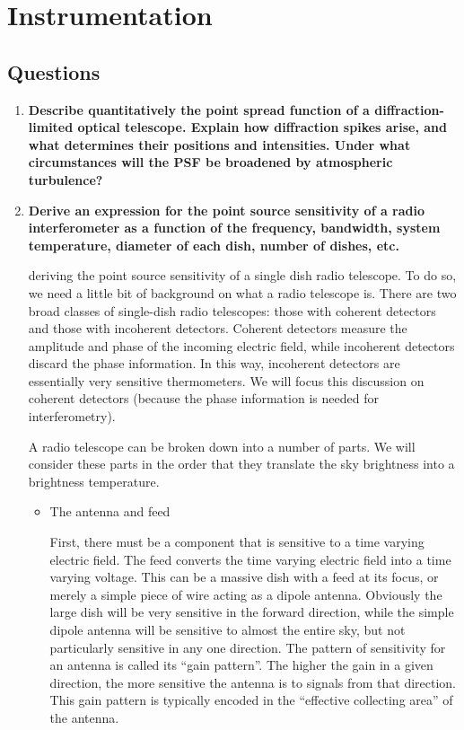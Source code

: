 \section{Instrumentation}
\subsection{Questions}
\begin{enumerate}
\item \textbf{Describe quantitatively the point spread function of a diffraction-limited optical
      telescope. Explain how diffraction spikes arise, and what determines their positions
      and intensities. Under what circumstances will the PSF be broadened by atmospheric
      turbulence?}
\item \textbf{Derive an expression for the point source sensitivity of a radio interferometer as
      a function of the frequency, bandwidth, system temperature, diameter of each dish,
      number of dishes, etc.}

       deriving the point source sensitivity of a single dish
      radio telescope.  To do so, we need a little bit of background on what a radio telescope
      is.  There are two broad classes of single-dish radio telescopes: those with coherent
      detectors and those with incoherent detectors.  Coherent detectors measure the amplitude
      and phase of the incoming electric field, while incoherent detectors discard the phase
      information.  In this way, incoherent detectors are essentially very sensitive thermometers.
      We will focus this discussion on coherent detectors (because the phase information is needed
      for interferometry).

      A radio telescope can be broken down into a number of parts.  We will consider these
      parts in the order that they translate the sky brightness into a brightness temperature.
      \begin{itemize}
      \item The antenna and feed

            First, there must be a component that is sensitive to a time varying electric
            field.  The feed converts the time varying electric field into a time varying voltage.
            This can be a massive dish with a feed at its focus, or merely a
            simple piece of wire acting as a dipole antenna.  Obviously the large dish will
            be very sensitive in the forward direction, while the simple dipole antenna will
            be sensitive to almost the entire sky, but not particularly sensitive in any one
            direction.  The pattern of sensitivity for an antenna is called its ``gain pattern''.
            The higher the gain in a given direction, the more sensitive the antenna is to signals
            from that direction.  This gain pattern is typically encoded in the ``effective
            collecting area'' of the antenna.


\end{itemize}
\end{enumerate}
